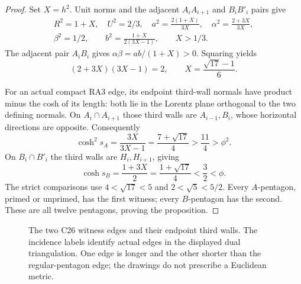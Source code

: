 \documentclass[11pt]{article}
\theoremstyle{remark}
\begin{document}
\begin{proof}
Set $X=h^2$. Unit norms and the adjacent $A_iA_{i+1}$ and $B_iB'_i$
pairs give
\[
 \begin{gathered}
 R^2=1+X,\quad U^2=2/3,\quad
 a^2=\frac{2(1+X)}{3X},\quad
 \alpha^2=\frac{2+3X}{3X},\\
 \beta^2=1/2,\qquad b^2=\frac{1+X}{2(3X-1)},\qquad X>1/3.
 \end{gathered}
\]
The adjacent pair $A_iB_i$ gives
$\alpha\beta=ab/(1+X)>0$. Squaring yields
\[
 (2+3X)(3X-1)=2,\qquad
 X=\frac{\sqrt{17}-1}{6}.
\]

For an actual compact RA3 edge, its endpoint third-wall normals have
product minus the cosh of its length: both lie in the Lorentz plane
orthogonal to the two defining normals. On $A_i\cap A_{i+1}$ those
third walls are $A_{i-1},B_i$, whose horizontal directions are opposite.
Consequently
\[
 \cosh^2 s_A=\frac{3X}{3X-1}=\frac{7+\sqrt{17}}4
       >\frac{11}4>\phi^2.
\]
On $B_i\cap B'_i$ the third walls are $H_i,H_{i+1}$, giving
\[
 \cosh s_B=\frac{1+3X}{2}=\frac{1+\sqrt{17}}4
       <\frac32<\phi.
\]
The strict comparisons use $4<\sqrt{17}<5$ and $2<\sqrt5<5/2$.
Every $A$-pentagon, primed or unprimed, has the first witness; every
$B$-pentagon has the second. These are all twelve pentagons, proving
the proposition.
\end{proof}

\begin{figure}[tb]
\centering
{}
\caption{The two C26 witness edges and their endpoint third walls.
The incidence labels identify actual edges in the displayed dual
triangulation. One edge is longer and the other shorter than the
regular-pentagon edge; the drawings do not prescribe a Euclidean metric.}
\label{fig:c26-witnesses}
\end{figure}
\end{document}

